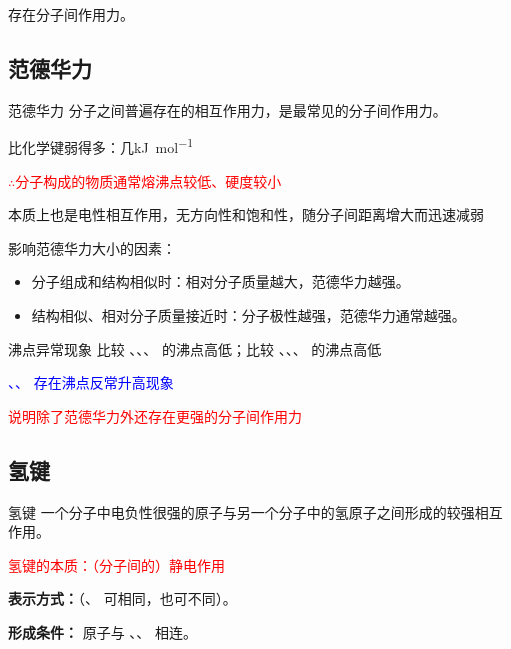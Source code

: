 		\begin{slt}
		存在分子间作用力。
		\end{slt}

	\subsection{范德华力}\label{subsec:范德华力}

		\begin{dfn}{范德华力}
			分子之间普遍存在的相互作用力，是最常见的分子间作用力。
		\end{dfn}

		比化学键弱得多：几\si{\kilo\joule\per\mole}

		\textcolor{red}{\(\therefore\)分子构成的物质通常熔沸点较低、硬度较小}

		本质上也是电性相互作用，无方向性和饱和性，随分子间距离增大而迅速减弱

		影响范德华力大小的因素：
		\begin{itemize}
			\item 分子组成和结构相似时：相对分子质量越大，范德华力越强。
			\item 结构相似、相对分子质量接近时：分子极性越强，范德华力通常越强。
		\end{itemize}

		\begin{xmp}{沸点异常现象}
			比较 、、、 的沸点高低；比较 、、、 的沸点高低

			\textcolor{blue}{、、 存在沸点反常升高现象}
			
			\textcolor{red}{说明除了范德华力外还存在更强的分子间作用力}
		\end{xmp}

	\subsection{氢键}\label{subsec:氢键}

		\begin{dfn}{氢键}
			一个分子中电负性很强的原子与另一个分子中的氢原子之间形成的较强相互作用。
		\end{dfn}

		\textcolor{red}{氢键的本质：（分子间的）静电作用}

		\noindent\textbf{表示方式：}（、 可相同，也可不同）。

		\noindent\textbf{形成条件：} 原子与 、、 相连。

